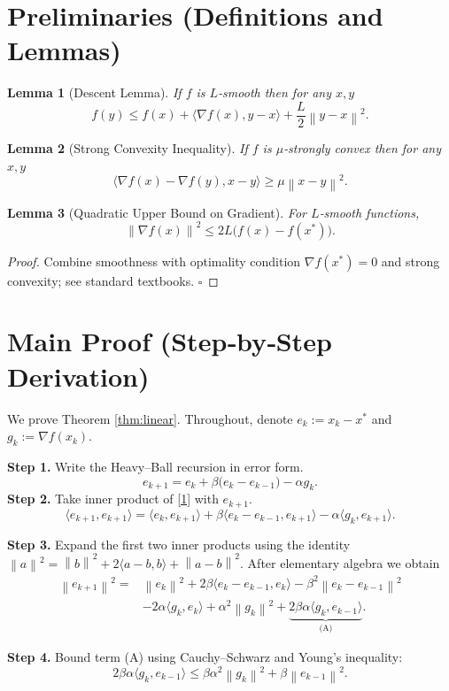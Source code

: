 \documentclass{article}
\newtheorem{lemma}{Lemma}
\newcommand{\norm}[1]{\left\lVert #1 \right\rVert}
\newcommand{\ip}[2]{\langle #1,#2\rangle}
\newcommand{\grad}{\nabla}
\begin{document}
\section*{Preliminaries (Definitions and Lemmas)}
\begin{lemma}[Descent Lemma]\label{lem:descent}
If $f$ is $L$‑smooth then for any $x,y$
\[
f(y)\le f(x)+\ip{\grad f(x)}{y-x}+\frac{L}{2}\norm{y-x}^{2}.
\]
\end{lemma}
\begin{lemma}[Strong Convexity Inequality]\label{lem:strong}
If $f$ is $\mu$‑strongly convex then for any $x,y$
\[
\ip{\grad f(x)-\grad f(y)}{x-y}\ge\mu\norm{x-y}^{2}.
\]
\end{lemma}
\begin{lemma}[Quadratic Upper Bound on Gradient]\label{lem:gradbound}
For $L$‑smooth functions,
\[
\norm{\grad f(x)}^{2}\le 2L\bigl(f(x)-f(x^{*})\bigr).
\]
\end{lemma}
\begin{proof}
Combine smoothness with optimality condition $\grad f(x^{*})=0$ and strong convexity; see standard textbooks. \hfill $\square$
\end{proof}

\section*{Main Proof (Step‑by‑Step Derivation)}
We prove Theorem \ref{thm:linear}.  
Throughout, denote $e_{k}:=x_{k}-x^{*}$ and $g_{k}:=\grad f(x_{k})$.

\bigskip
\noindent\textbf{Step 1.}  Write the Heavy–Ball recursion in error form.
\[
e_{k+1}=e_{k}+\beta\bigl(e_{k}-e_{k-1}\bigr)-\alpha g_{k}.
\tag{1}
\]
\noindent\textbf{Step 2.}  Take inner product of \eqref{1} with $e_{k+1}$.
\[
\ip{e_{k+1}}{e_{k+1}}=
\ip{e_{k}}{e_{k+1}}+\beta\ip{e_{k}-e_{k-1}}{e_{k+1}}-\alpha\ip{g_{k}}{e_{k+1}}.
\tag{2}
\]

\noindent\textbf{Step 3.}  Expand the first two inner products using the identity
$\norm{a}^{2}= \norm{b}^{2}+2\ip{a-b}{b}+\norm{a-b}^{2}$.
After elementary algebra we obtain
\[
\begin{aligned}
\norm{e_{k+1}}^{2}
=&\norm{e_{k}}^{2}+2\beta\ip{e_{k}-e_{k-1}}{e_{k}}-\beta^{2}\norm{e_{k}-e_{k-1}}^{2}\\
&-2\alpha\ip{g_{k}}{e_{k}}+\alpha^{2}\norm{g_{k}}^{2}
+\underbrace{2\beta\alpha\ip{g_{k}}{e_{k-1}}}_{\text{(A)}} .
\end{aligned}
\tag{3}
\]

\noindent\textbf{Step 4.}  Bound term (A) using Cauchy–Schwarz and Young’s inequality:
\[
2\beta\alpha\ip{g_{k}}{e_{k-1}}
\le  \beta\alpha^{2}\norm{g_{k}}^{2}+ \beta\norm{e_{k-1}}^{2}.
\tag{4}
\]
\end{document}
